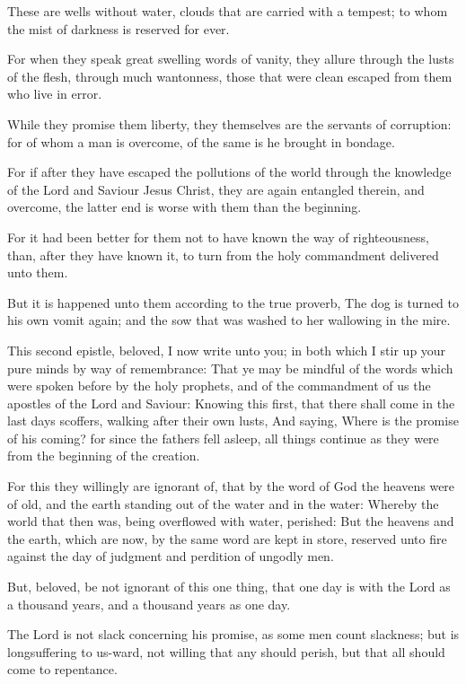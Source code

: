\Verse These are wells without water, clouds that are carried with a tempest; to whom the mist of darkness is reserved for ever.

\Verse For when they speak great swelling words of vanity, they allure through the lusts of the flesh, through much wantonness, those that were clean escaped from them who live in error.

\Verse While they promise them liberty, they themselves are the servants of corruption: for of whom a man is overcome, of the same is he brought in bondage.

\Verse For if after they have escaped the pollutions of the world through the knowledge of the Lord and Saviour Jesus Christ, they are again entangled therein, and overcome, the latter end is worse with them than the beginning.

\Verse For it had been better for them not to have known the way of righteousness, than, after they have known it, to turn from the holy commandment delivered unto them.

\Verse But it is happened unto them according to the true proverb, The dog is turned to his own vomit again; and the sow that was washed to her wallowing in the mire.


\Chapter
\Verse This second epistle, beloved, I now write unto you; in both which I stir up your pure minds by way of remembrance: \Verse That ye may be mindful of the words which were spoken before by the holy prophets, and of the commandment of us the apostles of the Lord and Saviour: \Verse Knowing this first, that there shall come in the last days scoffers, walking after their own lusts, \Verse And saying, Where is the promise of his coming? for since the fathers fell asleep, all things continue as they were from the beginning of the creation.

\Verse For this they willingly are ignorant of, that by the word of God the heavens were of old, and the earth standing out of the water and in the water: \Verse Whereby the world that then was, being overflowed with water, perished: \Verse But the heavens and the earth, which are now, by the same word are kept in store, reserved unto fire against the day of judgment and perdition of ungodly men.

\Verse But, beloved, be not ignorant of this one thing, that one day is with the Lord as a thousand years, and a thousand years as one day.

\Verse The Lord is not slack concerning his promise, as some men count slackness; but is longsuffering to us-ward, not willing that any should perish, but that all should come to repentance.

